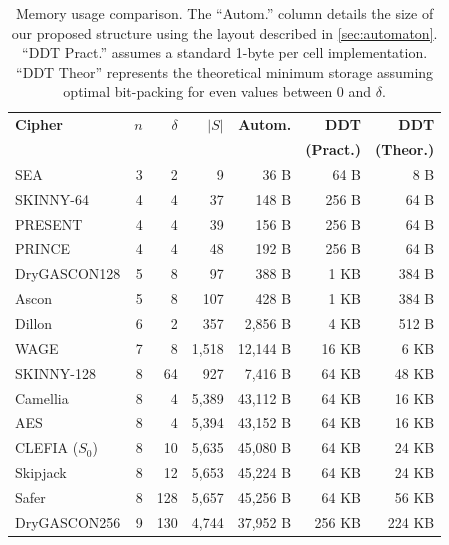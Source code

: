 \begin{table}
    \centering
    \caption{Memory usage comparison. The ``Autom.'' column details the size of our proposed structure using the layout described in \ref{sec:automaton}. ``DDT Pract.'' assumes a standard 1-byte per cell implementation. ``DDT Theor'' represents the theoretical minimum storage assuming optimal bit-packing for even values between 0 and $\delta$.}
    \label{tab:memory_usage}
    \setlength{\tabcolsep}{6pt}

    \begin{tabular}{lrrrrrr}
        \toprule
        
        \textbf{Cipher} & $n$ & $\delta$ & $|S|$ & \textbf{Autom.} & \textbf{DDT} & \textbf{DDT} \\
         
         & & & & & \textbf{(Pract.)} & \textbf{(Theor.)} \\
        
        \midrule
        
        SEA              & 3 &   2 &     9 &     36 B &  64 B &      8 B \\
        SKINNY-64        & 4 &   4 &    37 &    148 B & 256 B &    64 B \\
        PRESENT          & 4 &   4 &    39 &    156 B & 256 B &    64 B \\
        PRINCE           & 4 &   4 &    48 &    192 B & 256 B &    64 B \\
        DryGASCON128     & 5 &   8 &    97 &    388 B &  1 KB &    384 B \\
        Ascon            & 5 &   8 &   107 &    428 B &  1 KB &    384 B \\
        Dillon           & 6 &   2 &   357 &  2,856 B &  4 KB &    512 B \\
        WAGE             & 7 &   8 & 1,518 & 12,144 B &  16 KB &    6 KB \\
        SKINNY-128       & 8 &  64 &   927 &  7,416 B &  64 KB &   48 KB \\
        Camellia         & 8 &   4 & 5,389 & 43,112 B &  64 KB &   16 KB \\
        AES              & 8 &   4 & 5,394 & 43,152 B &  64 KB &   16 KB \\
        CLEFIA ($S_{0}$) & 8 &  10 & 5,635 & 45,080 B &  64 KB &   24 KB \\
        Skipjack         & 8 &  12 & 5,653 & 45,224 B &  64 KB &   24 KB \\
        Safer            & 8 & 128 & 5,657 & 45,256 B &  64 KB &   56 KB \\
        DryGASCON256     & 9 & 130 & 4,744 & 37,952 B & 256 KB & 224 KB \\

        \bottomrule
    \end{tabular}
\end{table}
